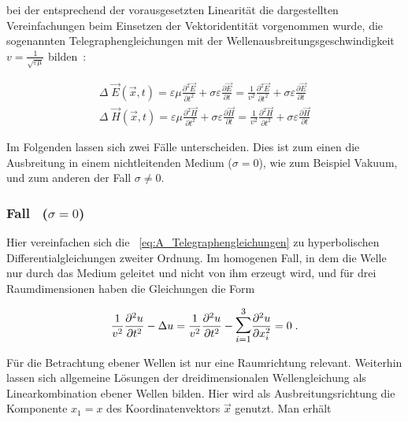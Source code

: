 bei der entsprechend der vorausgesetzten Linearität die dargestellten Vereinfachungen beim Einsetzen der Vektoridentität vorgenommen wurde, die sogenannten Telegraphengleichungen mit der Wellenausbreitungsgeschwindigkeit $v = \frac{1}{\sqrt{\varepsilon \mu}}$ bilden~\cite{EM_Schirmung}:

\begin{subequations}
    \label{eq:A_Telegraphengleichungen}
    \begin{align}
        \Delta \; \vec E(\vec x,t) = \varepsilon \mu \frac{\partial ^2 \vec E}{\partial t^2} + \sigma \varepsilon \frac{\partial  \vec E}{\partial t}  = \frac{1}{v^2} \frac{\partial ^2 \vec E}{\partial t^2} + \sigma \varepsilon \frac{\partial  \vec E}{\partial t} \label{subeq:A_Telegraphengleichungen1}\\
        \Delta \; \vec H(\vec x,t) = \varepsilon \mu \frac{\partial ^2 \vec H}{\partial t^2} + \sigma \varepsilon \frac{\partial  \vec H}{\partial t} = \frac{1}{v^2} \frac{\partial ^2 \vec H}{\partial t^2} + \sigma \varepsilon \frac{\partial  \vec H}{\partial t}  \label{subeq:A_Telegraphengleichungen2}
    \end{align}
\end{subequations}

Im Folgenden lassen sich zwei Fälle unterscheiden. Dies ist zum einen die Ausbreitung in einem nichtleitenden Medium ($\sigma = 0$), wie zum Beispiel Vakuum, und zum anderen der Fall $\sigma \neq 0$. 

\subsubsection{Fall~ ($\sigma = 0$)}

Hier vereinfachen sich die \Gleichungen~\eqref{eq:A_Telegraphengleichungen} zu hyperbolischen Differentialgleichungen zweiter Ordnung. Im homogenen Fall, in dem die Welle nur durch das Medium geleitet und nicht von ihm erzeugt wird, und für drei Raumdimensionen haben die Gleichungen die Form

\begin{equation}
     \frac{1}{v^2}\frac{\partial ^2 u}{\partial t^2} - \Delta u = \frac{1}{v^2}\frac{\partial ^2 u}{\partial t^2} -  \mathlarger{\mathlarger{\sum}}_{i=1}^3 \frac{\partial^2 u}{\partial x_i^2} = 0   \; \text{.}
\end{equation}

Für die Betrachtung ebener Wellen ist nur eine Raumrichtung relevant. Weiterhin lassen sich allgemeine Lösungen der dreidimensionalen Wellengleichung als Linearkombination ebener Wellen bilden. Hier wird als Ausbreitungsrichtung die Komponente $x_1 = x$ des Koordinatenvektors $\vec x$ genutzt. Man erhält

